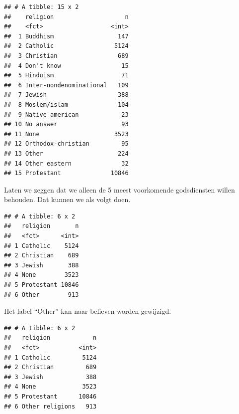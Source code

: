 \documentclass[]{tufte-book}
\newenvironment{Shaded}{}{}
\newcommand{\DataTypeTok}[1]{\textcolor[rgb]{0.56,0.13,0.00}{#1}}
\newcommand{\DecValTok}[1]{\textcolor[rgb]{0.25,0.63,0.44}{#1}}
\newcommand{\KeywordTok}[1]{\textcolor[rgb]{0.00,0.44,0.13}{\textbf{#1}}}
\newcommand{\NormalTok}[1]{#1}
\newcommand{\OperatorTok}[1]{\textcolor[rgb]{0.40,0.40,0.40}{#1}}
\newcommand{\StringTok}[1]{\textcolor[rgb]{0.25,0.44,0.63}{#1}}
\begin{document}
\begin{verbatim}
## # A tibble: 15 x 2
##    religion                    n
##    <fct>                   <int>
##  1 Buddhism                  147
##  2 Catholic                 5124
##  3 Christian                 689
##  4 Don't know                 15
##  5 Hinduism                   71
##  6 Inter-nondenominational   109
##  7 Jewish                    388
##  8 Moslem/islam              104
##  9 Native american            23
## 10 No answer                  93
## 11 None                     3523
## 12 Orthodox-christian         95
## 13 Other                     224
## 14 Other eastern              32
## 15 Protestant              10846
\end{verbatim}

Laten we zeggen dat we alleen de 5 meest voorkomende godsdiensten willen behouden. Dat kunnen we als volgt doen.

\begin{Shaded}
\end{Shaded}

\begin{verbatim}
## # A tibble: 6 x 2
##   religion       n
##   <fct>      <int>
## 1 Catholic    5124
## 2 Christian    689
## 3 Jewish       388
## 4 None        3523
## 5 Protestant 10846
## 6 Other        913
\end{verbatim}

Het label ``Other'' kan naar believen worden gewijzigd.

\begin{Shaded}
\end{Shaded}

\begin{verbatim}
## # A tibble: 6 x 2
##   religion            n
##   <fct>           <int>
## 1 Catholic         5124
## 2 Christian         689
## 3 Jewish            388
## 4 None             3523
## 5 Protestant      10846
## 6 Other religions   913
\end{verbatim}
\end{document}
